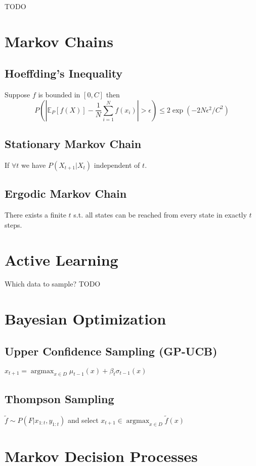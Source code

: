 \documentclass[11pt]{article}
\newcommand{\argmax}{\operatorname{argmax}}
\newcommand{\E}{\mathbb{E}}
\begin{document}
\begin{multicols*}{3}
TODO


\section*{Markov Chains}

\subsection*{Hoeffding's Inequality}
Suppose $f$ is bounded in $\left[0,C\right]$ then $$P\left(| \E_P\left[f(X)\right] - \frac{1}{N} \sum_{i=1}^{N} f(x_i)| > \epsilon \right) \leq 2 \exp\left(-2N\epsilon^2/C^2\right)$$
\subsection*{Stationary Markov Chain}
If $\forall t$ we have $P(X_{t+1} | X_{t})$ independent of $t$.
\subsection*{Ergodic Markov Chain}
There exists a finite $t$ s.t. all states can be reached from every state in exactly $t$ steps.













\section*{Active Learning}
Which data to sample?
TODO

\section*{Bayesian Optimization}
\subsection*{Upper Confidence Sampling (GP-UCB)}
$x_{t+1} = \argmax_{x\in D} \mu_{t-1}(x) + \beta_t \sigma_{t-1} (x)$
\subsection*{Thompson Sampling}
$\tilde{f} \sim P(F|x_{1:t}, y_{1:t})$ and select $x_{t+1} \in \argmax_{x\in D} \tilde{f}(x)$
\section*{Markov Decision Processes}


\end{multicols*}
\end{document}
